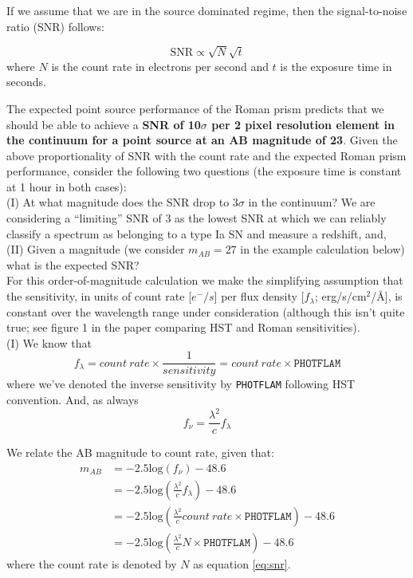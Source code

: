 \documentclass[12pt]{article}
\begin{document}
If we assume that we are in the source dominated regime, then the signal-to-noise ratio (SNR) follows:

\begin{equation}
\label{eq:snr}
\mathrm{SNR} \propto \sqrt{N}\sqrt{t}
\end{equation}
where $N$ is the count rate in electrons per second and $t$ is the exposure time in seconds.

The expected point source performance of the Roman prism predicts that we should be able to achieve a {\bf SNR of 10$\sigma$ per 2 pixel resolution element in the continuum for a point source at an AB magnitude of 23}. Given the above proportionality of SNR with the count rate and the expected Roman prism performance, consider the following two questions (the exposure time is constant at 1 hour in both cases):\\
(I) At what magnitude does the SNR drop to 3$\sigma$ in the continuum? We are considering a ``limiting'' SNR of 3 as the lowest SNR at which we can reliably classify a spectrum as belonging to a type Ia SN and measure a redshift, and,\\
(II) Given a magnitude (we consider $m_{AB} = 27$ in the example calculation below) what is the expected SNR?\\

For this order-of-magnitude calculation we make the simplifying assumption that the sensitivity, in units of count rate [$e^-/s$] per flux density [$f_\lambda$; erg/s/cm$^2$/\AA], is constant over the wavelength range under consideration (although this isn't quite true; see figure 1 in the paper comparing HST and Roman sensitivities).\\
(I) We know that\\
\begin{equation}
f_\lambda = count\ rate \times \frac{1}{sensitivity} = count\ rate \times \texttt{PHOTFLAM}
\end{equation}
where we've denoted the inverse sensitivity by \texttt{PHOTFLAM} following HST convention. And, as always\\
\begin{equation}
f_\nu = \frac{\lambda^2}{c} f_\lambda
\end{equation}

We relate the AB magnitude to count rate, given that:
\begin{equation}
\begin{aligned}
m_{AB} &= -2.5\mathrm{log}(f_\nu) - 48.6 \\
&= -2.5\mathrm{log}\left(\frac{\lambda^2}{c} f_\lambda \right) - 48.6 \\
&= -2.5\mathrm{log}\left(\frac{\lambda^2}{c} count\ rate \times \texttt{PHOTFLAM} \right) - 48.6 \\
&= -2.5\mathrm{log}\left(\frac{\lambda^2}{c} N \times \texttt{PHOTFLAM} \right) - 48.6
\end{aligned}
\end{equation}
where the count rate is denoted by $N$ as equation \ref{eq:snr}.\\
\end{document}
